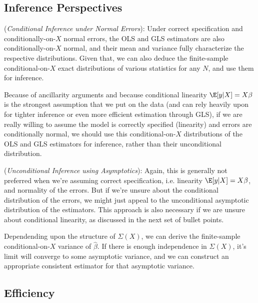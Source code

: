 \documentclass[12pt]{article}
\theoremstyle{plain}
\theoremstyle{definition}
\theoremstyle{remark}
\begin{document}
\subsection{Inference Perspectives}

(\emph{Conditional Inference under Normal Errors}):
Under correct specification and conditionally-on-$X$ normal
errors, the OLS and GLS estimators are also conditionally-on-$X$
normal, and their mean and variance fully characterize the
respective distributions.
Given that, we can also deduce the finite-sample
conditional-on-$X$ exact distributions of various statistics for
any $N$, and use them for inference.

Because of ancillarity arguments and because conditional
linearity $\E[y|X]=X\beta$ is the strongest assumption that we
put on the data (and can rely heavily upon for tighter inference
or even more efficient estimation through GLS),
if we are really willing to assume the model is correctly
specified (linearity) and errors are conditionally normal,
we should use this conditional-on-$X$ distributions of
the OLS and GLS estimators for inference, rather than their
unconditional distribution.

(\emph{Unconditional Inference using Asymptotics}):
Again, this is generally not preferred when we're assuming
correct specification, i.e. linearity $\E[y|X]=X\beta$, and
normality of the errors.
But if we're unsure about the conditional distribution of the
errors, we might just appeal to the unconditional asymptotic
distribution of the estimators.
This approach is also necessary if we are unsure about
conditional linearity, as discussed in the next set of bullet
points.

Dependending upon the structure of $\Sigma(X)$, we can derive
the finite-sample conditional-on-$X$ variance of $\hat{\beta}$.
If there is enough independence in $\Sigma(X)$, it's limit will
converge to some asymptotic variance, and we can construct an
appropriate consistent estimator for that asymptotic variance.


\subsection{Efficiency}
\end{document}

